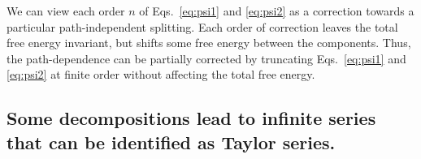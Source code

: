 \documentclass{article}
\begin{document}
We can view each order $n$ of Eqs.~\ref{eq:psi1} and \ref{eq:psi2} as a correction towards a particular path-independent splitting. Each order of correction leaves the total free energy invariant, but shifts some free energy between the components. Thus, the path-dependence can be partially corrected by truncating Eqs.~\ref{eq:psi1} and \ref{eq:psi2} at finite order without affecting the total free energy.








\subsection{Some decompositions lead to infinite series that can be identified as Taylor series.}
\end{document}
